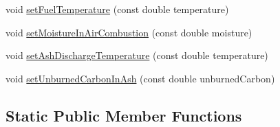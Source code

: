 \begin{DoxyCompactItemize}
\item 
void \hyperlink{class_solid_liquid_flue_gas_material_a420ba1234c5f8c4b93f190b61046a589}{set\+Fuel\+Temperature} (const double temperature)
\item 
void \hyperlink{class_solid_liquid_flue_gas_material_a1a5f1bd3008e78cce62edb8aca642284}{set\+Moisture\+In\+Air\+Combustion} (const double moisture)
\item 
void \hyperlink{class_solid_liquid_flue_gas_material_ad29543a88737c3d051c7d824287bc791}{set\+Ash\+Discharge\+Temperature} (const double temperature)
\item 
void \hyperlink{class_solid_liquid_flue_gas_material_adf052dd1bdceeab710a4986b1fd874b9}{set\+Unburned\+Carbon\+In\+Ash} (const double unburned\+Carbon)
\end{DoxyCompactItemize}
\subsection*{Static Public Member Functions}
